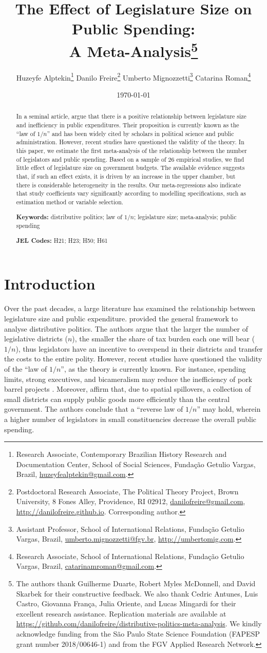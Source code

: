 \documentclass[a4paper,12pt]{article}
\title{The Effect of Legislature Size on Public Spending:\\ A Meta-Analysis\thanks{The authors thank Guilherme Duarte, Robert Myles McDonnell, and David Skarbek for their constructive feedback. We also thank Cedric Antunes, Luis Castro, Giovanna França, Julia Oriente, and Lucas Mingardi for their excellent research assistance. Replication materials are available at \url{https://github.com/danilofreire/distributive-politics-meta-analysis}. We kindly acknowledge funding from the São Paulo State Science Foundation (FAPESP grant number 2018/00646-1) and from the FGV Applied Research Network.}}
\author{Huzeyfe Alptekin\thanks{Research Associate, Contemporary Brazilian History Research and Documentation Center, School of Social Sciences, Fundação Getulio Vargas, Brazil, \url{huzeyfealptekin@gmail.com}.} \hspace{.5cm} Danilo Freire\thanks{Postdoctoral Research Associate, The Political Theory Project, Brown University, 8 Fones Alley, Providence, RI 02912, \url{danilofreire@gmail.com}, \url{http://danilofreire.github.io}. Corresponding author.} \hspace{.5cm} Umberto Mignozzetti\thanks{Assistant Professor, School of International Relations, Fundação Getulio Vargas, Brazil, \url{umberto.mignozzetti@fgv.br}, \url{http://umbertomig.com}.} \hspace{.5cm} Catarina Roman\thanks{Research Associate, School of International Relations, Fundação Getulio Vargas, Brazil, \url{catarinamroman@gmail.com}.}}
\date{\today}
\begin{document}
\maketitle

\begin{abstract}
\noindent In a seminal article, \citet{weingast1981political} argue that there
is a positive relationship between legislature size and inefficiency in public
expenditures. Their proposition is currently known as the ``law of $1/n$'' and
has been widely cited by scholars in political science and public
administration.  However, recent studies have questioned the validity of the
theory. In this paper, we estimate the first meta-analysis of the relationship
between the number of legislators and public spending. Based on a sample of 26
empirical studies, we find little effect of legislature size on government
budgets. The available evidence suggests that, if such an effect exists, it is
driven by an increase in the upper chamber, but there is considerable
heterogeneity in the results. Our meta-regressions also indicate that study
coefficients vary significantly according to modelling specifications, such as
estimation method or variable selection.

\vspace{.4cm}
\noindent \textbf{Keywords:} distributive politics; law of $1/n$; legislature size; meta-analysis; public spending

\noindent \textbf{JEL Codes:} H21; H23; H50; H61
\end{abstract}

\newpage

\section{Introduction}
\label{sec:intro}

Over the past decades, a large literature has examined the relationship between
legislature size and public expenditure. \citet{weingast1981political} provided
the general framework to analyse distributive politics. The authors argue that
the larger the number of legislative districts ($n$), the smaller the share of
tax burden each one will bear ($1/n$), thus legislators have an incentive to
overspend in their districts and transfer the costs to the entire polity.
However, recent studies have questioned the validity of the ``law of $1/n$'', as
the theory is currently known. For instance, spending limits, strong executives,
and bicameralism may reduce the inefficiency of pork barrel projects
\citep{bradbury2009spatially,chen_malhotra_2007,primo2006stop}.  Moreover,
\citet{primo2008distributive} affirm that, due to spatial spillovers, a
collection of small districts can supply public goods more efficiently than the
central government. The authors conclude that a ``reverse law of $1/n$'' may
hold, wherein a higher number of legislators in small constituencies decrease
the overall public spending.
\end{document}
